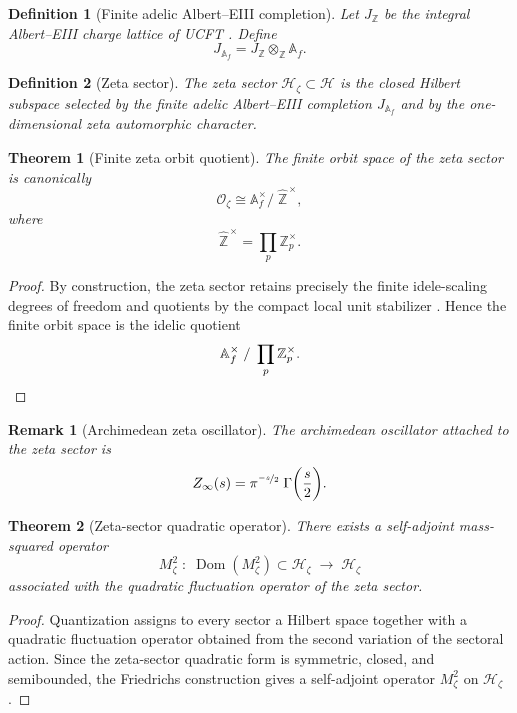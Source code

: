 \documentclass[pdflatex,sn-mathphys-num]{sn-jnl}
\theoremstyle{thmstyleone}
\newtheorem{theorem}{Theorem}
\theoremstyle{thmstyletwo}
\newtheorem{remark}{Remark}
\theoremstyle{thmstylethree}
\newtheorem{definition}{Definition}
\begin{document}
  \begin{definition}[Finite adelic Albert--EIII completion]
  Let \(J_{\mathbb Z}\) be the integral Albert--EIII charge lattice of UCFT
  \cite{BelnaUCFT2025}. Define
  \[
    J_{\mathbb A_f}
    =
    J_{\mathbb Z}\otimes_{\mathbb Z}\mathbb A_f .
  \]
  \end{definition}

  \begin{definition}[Zeta sector]
  The zeta sector \(\mathcal H_\zeta\subset \mathcal H\) is the closed Hilbert
  subspace selected by the finite adelic Albert--EIII completion
  \(J_{\mathbb A_f}\) and by the one-dimensional zeta automorphic character.
  \end{definition}

  \begin{theorem}[Finite zeta orbit quotient]
  The finite orbit space of the zeta sector is canonically
  \[
    \mathcal O_{\zeta}
    \cong
    \mathbb A_f^\times / \; \widehat{\mathbb Z}^{\,\times},
  \]
  where
  \[
    \widehat{\mathbb Z}^{\,\times}
    =
    \prod_p \mathbb Z_p^\times .
  \]
  \end{theorem}

  \begin{proof}
  By construction, the zeta sector retains precisely the finite idele-scaling
  degrees of freedom and quotients by the compact local unit stabilizer
  \cite{Tate1967}.
  Hence the
  finite orbit space is the idelic quotient
  \[
    \mathbb A_f^\times \; / \; \prod_p\mathbb Z_p^\times .\qedhere
  \]
  \end{proof}

  \begin{remark}[Archimedean zeta oscillator]
  The archimedean oscillator attached to the zeta sector is
  \[
    Z_\infty(s)
    =
    \pi^{\nicefrac{-s}{2}} \;
    \Gamma\biggl(\frac{s}{2}\biggr).
  \]
  \end{remark}

  \begin{theorem}[Zeta-sector quadratic operator]
  There exists a self-adjoint mass-squared operator
  \[
    M_\zeta^2 \; : \; \operatorname{Dom}\left(M_\zeta^2\right)\subset\mathcal H_\zeta\;\to\;\mathcal H_\zeta
  \]
  associated with the quadratic fluctuation operator of the zeta sector.
  \end{theorem}

  \begin{proof}
  Quantization \cite{BelnaUCFT2025} assigns to every sector a Hilbert space
  together with a quadratic fluctuation operator obtained from the second
  variation of the sectoral action. Since the zeta-sector quadratic form is
  symmetric, closed, and semibounded, the Friedrichs construction gives a
  self-adjoint operator \(M_\zeta^2\) on \(\mathcal H_\zeta\).
  \end{proof}
\end{document}
